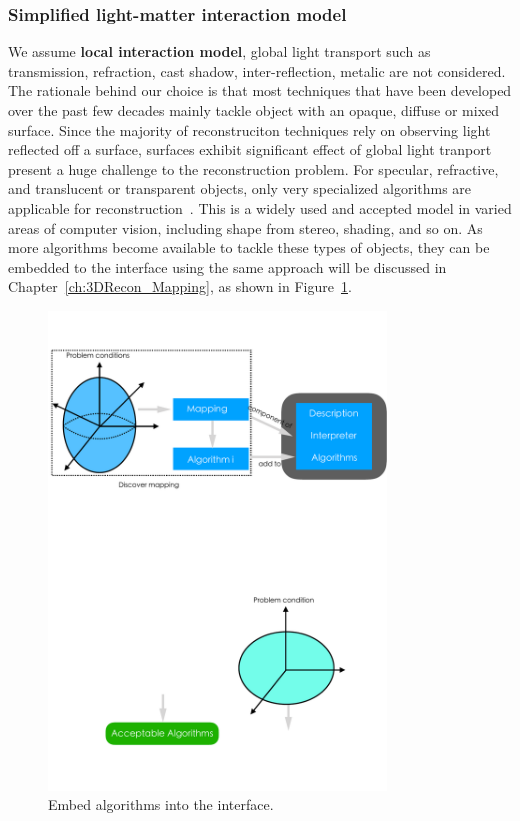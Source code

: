 \subsubsection{Simplified light-matter interaction model}
We assume \textbf{local interaction model}, \ie global light transport such as transmission, refraction, cast shadow, inter-reflection, metalic are not considered. The rationale behind our choice is that most techniques that have been developed over the past few decades mainly tackle object with an opaque, diffuse or mixed surface. Since the majority of reconstruciton techniques rely on observing light reflected off a surface, surfaces exhibit significant effect of global light tranport present a huge challenge to the reconstruction problem. For specular, refractive, and translucent or transparent objects, only very specialized algorithms are applicable for reconstruction~\cite{ihrke2010transparent}. This is a widely used and accepted model in varied areas of computer vision, including shape from stereo, shading, and so on. As more algorithms become available to tackle these types of objects, they can be embedded to the interface using the same approach will be discussed in Chapter~\ref{ch:3DRecon_Mapping}, as shown in Figure~\ref{fig:embed_algo}.
\begin{figure}[!htbp]
\centering
\includegraphics[width=0.8\textwidth]{img/prob_space/embed_algo.pdf}
\caption{Embed algorithms into the interface.}
\label{fig:embed_algo}
\end{figure}

